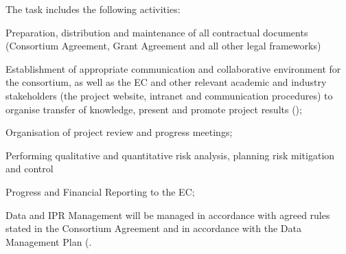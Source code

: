 \begin{workpackage}[id=management,type=MGT,wphases=0-36!.44,
  title=Project Management,
  short=Management,
  lead=SRL,
  MPRM=1,
  QSRM=1,
  IFRRM=1,
  UIORM=1,
  SRLRM=12,
  swsites
]
\begin{tasklist}
\begin{task}[
  title=Administrative Management,
  id=admin,
  lead=SRL,
  PM=6,
  wphases={0-36!.166},
  partners={MP,QS,UIO,IFR},
]
The task includes the following activities:
\begin{compactenum}
\item Preparation, distribution and maintenance of all contractual documents
  (Consortium Agreement, Grant Agreement and all other legal frameworks)
\item Establishment of appropriate communication and collaborative environment
  for the consortium, as well as the EC and other relevant academic and industry
  stakeholders (the project website, intranet and communication procedures) to
  organise transfer of knowledge, present and promote project results
  ();
\item Organisation of project review and progress meetings;
\item Performing qualitative and quantitative risk analysis, planning risk
  mitigation and control
\item Progress and Financial Reporting to the EC;
\item Data and IPR Management will be managed in accordance with agreed rules
  stated in the Consortium Agreement and in accordance with the Data Management
  Plan (.
\end{compactenum}
\end{task}


\end{tasklist}
\end{workpackage}
